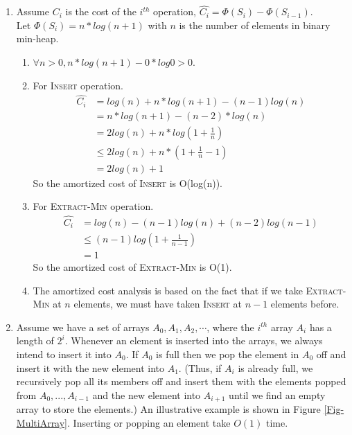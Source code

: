 \documentclass[12pt,a4paper]{article}
\makeatletter
\newtheorem*{solution}{Solution}
\theoremstyle{definition}
\renewenvironment{solution}[1][Solution] {\par\pushQED{\qed}\normalfont\topsep6\p@\@plus6\p@\relax\trivlist\item[\hskip\labelsep\bfseries#1\@addpunct{.}]\ignorespaces}{\popQED\endtrivlist\@endpefalse} \makeatother
\makeatother
\begin{document}
\begin{enumerate}
    \begin{solution}
        Assume $C_i$ is the cost of the $i^{th}$ operation, $\hat{C_i}=\Phi(S_i)-\Phi(S_{i-1})$.\\
        Let $\Phi(S_i)=n*log(n+1)$ with $n$ is the number of elements in binary min-heap.
        \begin{enumerate}
            \item $\forall n>0,n*log(n+1)-0*log0>0$.
            \item For \textsc{Insert} operation.
            \begin{equation}
            \begin{aligned}
                \hat{C_i}&=log(n)+n*log(n+1)-(n-1)log(n)\\&=n*log(n+1)-(n-2)*log(n)\\&
                =2log(n)+n*log(1+\frac{1}{n})\\&\le 2log(n)+n*(1+\frac{1}{n}-1)\\&
                =2log(n)+1
            \end{aligned}
            \end{equation}
            So the amortized cost of \textsc{Insert} is O(log(n)).
            \item For \textsc{Extract-Min} operation.
            \begin{equation}
            \begin{aligned}
                \hat{C_i}&=log(n)-(n-1)log(n)+(n-2)log(n-1)\\&
                \le (n-1)log(1+\frac{1}{n-1})\\&=1
            \end{aligned}
            \end{equation}
            So the amortized cost of \textsc{Extract-Min} is O(1).
            \item The amortized cost analysis is based on the fact that if we take \textsc{Extract-Min} at $n$ elements, we must have taken \textsc{Insert} at $n-1$ elements before.
        \end{enumerate}
    \end{solution}
	\item Assume we have a set of arrays $A_0, A_1, A_2,\cdots$, where the $i^{th}$ array $A_i$ has a length of $2^i$. Whenever an element is inserted into the arrays, we always intend to insert it into $A_0$. If $A_0$ is full then we pop the element in $A_0$ off and insert it with the new element into $A_{1}$. (Thus, if $A_{i}$ is already full, we recursively pop all its members off and insert them with the elements popped from $A_0,...,A_{i-1}$ and the new element into $A_{i+1}$ until we find an empty array to store the elements.) An illustrative example is shown in Figure \ref{Fig-MultiArray}. Inserting or popping an element take $O(1)$ time.


\end{enumerate}
\end{document}
